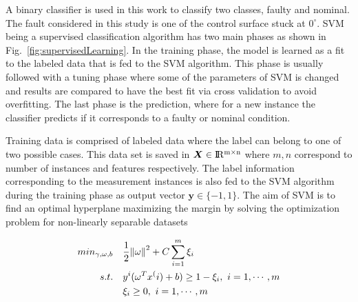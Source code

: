 A binary classifier is used in this work to classify two classes, faulty and nominal. The fault considered in this study is one of the control surface stuck at $0^{\circ}$. SVM being a supervised classification algorithm has two main phases as shown in Fig.~\ref{fig:supervisedLearning}. In the training phase, the model is learned as a fit to the labeled data that is fed to the SVM algorithm. This phase is usually followed with a tuning phase where some of the parameters of SVM is changed and results are compared to have the best fit via cross validation to avoid overfitting. The last phase is the prediction, where for a new instance the classifier predicts if it corresponds to a faulty or nominal condition.

Training data is comprised of labeled data where the label can belong to one of two possible cases. This data set is saved in $\bm{X} \in {\rm I\!R^{m \times n}}  $ where $m,n$ correspond to number of instances and features respectively. The label information corresponding to the measurement instances is also fed to the SVM algorithm during the training phase as output vector $\bm{y} \in \{-1,1\}$. The aim of SVM is to find an optimal hyperplane maximizing the margin by solving the optimization problem for non-linearly separable datasets

\begin{align}
min_{\gamma,\omega,b} \quad & \frac{1}{2} \norm{\omega}^2 + C \sum\limits_{i = 1}^m \xi_i \\
s.t. \quad & y^{i}(\omega^T x^(i) + b) \geq 1 - \xi_i, \ i = 1, \cdots, m\\
 & \xi_i \geq 0, \ i = 1, \cdots, m
\end{align}

